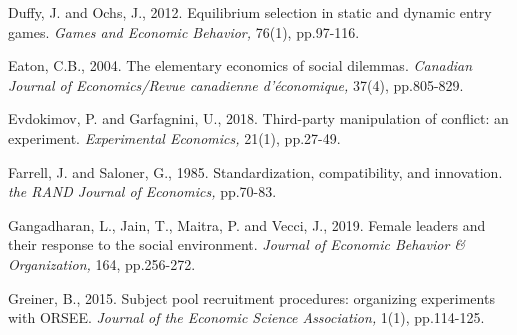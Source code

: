 \documentclass[12pt, letterpaper]{article}
\theoremstyle{plain}
\begin{document}
\begin{thebibliography}{10}

\bibitem{} Duffy, J. and Ochs, J., 2012. Equilibrium selection in static and dynamic entry games. \textit{Games and Economic Behavior,} 76(1), pp.97-116.


\bibitem{}Eaton, C.B., 2004. The elementary economics of social dilemmas. \textit{Canadian Journal of Economics/Revue canadienne d'\'{e}conomique,} 37(4), pp.805-829.

  Evdokimov, P. and Garfagnini, U., 2018. Third-party manipulation of conflict: an experiment. \textit{Experimental Economics,} 21(1), pp.27-49.

  Farrell, J. and Saloner, G., 1985. Standardization, compatibility, and innovation. \textit{the RAND Journal of Economics,} pp.70-83.

\bibitem{} Gangadharan, L., Jain, T., Maitra, P. and Vecci, J., 2019. Female leaders and their response to the social environment. \textit{Journal of Economic Behavior \& Organization,} 164, pp.256-272.




\bibitem{} Greiner, B., 2015. Subject pool recruitment procedures: organizing experiments with ORSEE. \textit{Journal of the Economic Science Association,} 1(1), pp.114-125.




\end{thebibliography}
\end{document}
